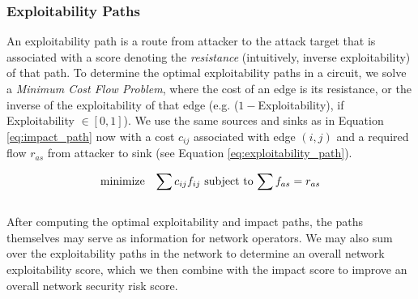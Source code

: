 \subsubsection{Exploitability Paths} 

An exploitability path is a route from attacker to the attack target that is associated with a score  denoting the \textit{resistance} (intuitively, inverse exploitability) of that path. To determine the optimal exploitability paths in a circuit, we solve a \textit{Minimum Cost Flow Problem}, where the cost of an edge is its resistance, or the inverse of the exploitability of that edge (e.g. ($1-$Exploitability), if Exploitability $\in [0,1]$). We use the same sources and sinks as in Equation \ref{eq:impact_path} now with a cost $c_{ij}$ associated with edge $(i,j)$ and a required flow $r_{as}$ from attacker to sink (see Equation \ref{eq:exploitability_path}).

\begin{equation}
\begin{array}{ll@{}ll}
\text{minimize}  & \displaystyle\sum  c_{ij}f_{ij}
\text{ subject to } & \displaystyle\sum f_{as} = r_{as}
\end{array}
\label{eq:exploitability_path}
\end{equation}\\
After computing the optimal exploitability and impact paths, the paths themselves may serve as information for network operators. We may also sum over the exploitability paths in the network to determine an overall network exploitability score, which we then combine with the impact score to improve an overall network security risk score.

